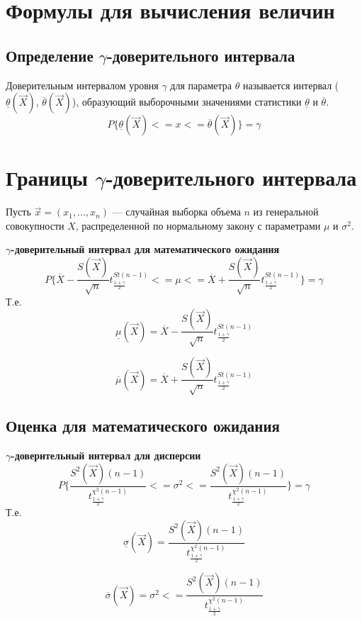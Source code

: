 \section{Формулы для вычисления величин}
\subsection{Определение $\gamma$-доверительного интервала}
Доверительным интервалом уровня $\gamma$ для параметра $\theta$ называется интервал ($\underline\theta(\vec X)$, $\overline\theta(\vec X)$), образующий выборочными значениями статистики $\underline\theta$ и $\overline\theta$.\\
\begin{equation*}
	P\{\underline\theta(\vec X) <= x <= \overline\theta(\vec X) \} = \gamma
\end{equation*}

\section{Границы $\gamma$-доверительного интервала}

Пусть $\vec x = (x_1, ..., x_n)$ — случайная выборка объема $n$ из генеральной совокупности $X$, распределенной по нормальному закону с параметрами $\mu$ и $\sigma^{2}$.

\textbf{$\gamma$-доверительный интервал для математического ожидания}
\begin{equation*}
	P\{\overline{X} - \dfrac{S(\vec{X})}{\sqrt{n}} t^{St(n-1)}_{\frac{1+\gamma}{2}} <= \mu <= \overline{X} + \dfrac{S(\vec{X})}{\sqrt{n}} t^{St(n-1)}_{\frac{1+\gamma}{2}} \} = \gamma
\end{equation*}
Т.е.\\
\begin{equation*}
	\underline\mu(\vec X) = \overline{X} - \dfrac{S(\vec{X})}{\sqrt{n}} t^{St(n-1)}_{\frac{1+\gamma}{2}}
\end{equation*}

\begin{equation*}
	\overline\mu(\vec X)  = \overline{X} + \dfrac{S(\vec{X})}{\sqrt{n}} t^{St(n-1)}_{\frac{1+\gamma}{2}}
\end{equation*}

\subsection{Оценка для математического ожидания}

\textbf{$\gamma$-доверительный интервал для дисперсии}
\begin{equation*}
	P\{ \dfrac{S^2(\vec{X}) (n-1)}{t^{\chi^{2}(n-1)}_{\frac{1+\gamma}{2}}} <= \sigma^2 <= \dfrac{S^2(\vec{X}) (n-1)}{t^{\chi^{2}(n-1)}_{\frac{1+\gamma}{2}}}  \} = \gamma
\end{equation*}
Т.е.\\
\begin{equation*}
	\underline\sigma(\vec X) = \dfrac{S^2(\vec{X}) (n-1)}{t^{\chi^{2}(n-1)}_{\frac{1+\gamma}{2}}}
\end{equation*}

\begin{equation*}
	\overline\sigma(\vec X)  = \sigma^2 <= \dfrac{S^2(\vec{X}) (n-1)}{t^{\chi^{2}(n-1)}_{\frac{1+\gamma}{2}}}
\end{equation*}






